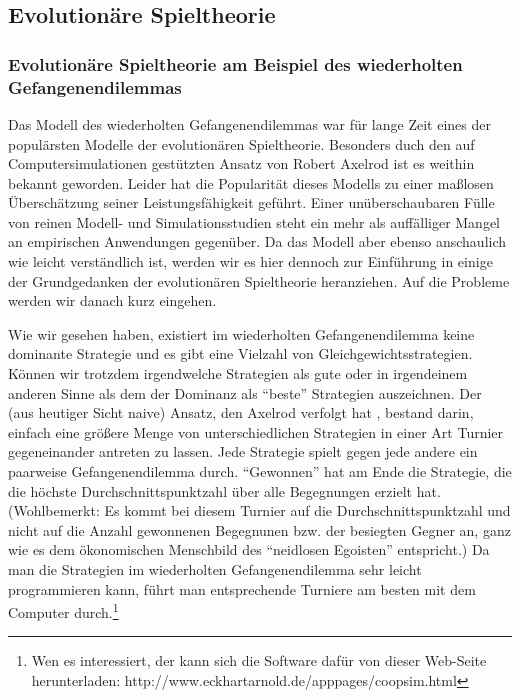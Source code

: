 \subsection{Evolutionäre Spieltheorie}

\subsubsection{Evolutionäre Spieltheorie am Beispiel des wiederholten
Gefangenendilemmas}

Das Modell des wiederholten Gefangenendilemmas war für lange Zeit eines der
populärsten Modelle der evolutionären Spieltheorie. Besonders duch den auf
Computersimulationen gestützten Ansatz von Robert Axelrod \cite[]{axelrod:1984}
ist es weithin bekannt geworden. Leider hat die Popularität dieses Modells zu
einer maßlosen Überschätzung seiner Leistungsfähigkeit geführt. Einer
unüberschaubaren Fülle von reinen Modell- und Simulationsstudien steht ein mehr
als auffälliger Mangel an empirischen Anwendungen gegenüber. Da das Modell aber
ebenso anschaulich wie leicht verständlich ist, werden wir es hier dennoch zur
Einführung in einige der Grundgedanken der evolutionären Spieltheorie
heranziehen. Auf die Probleme werden wir danach kurz eingehen.

Wie wir gesehen haben, existiert im wiederholten Gefangenendilemma keine
dominante Strategie und es gibt eine Vielzahl von Gleichgewichtsstrategien.
Können wir trotzdem irgendwelche Strategien als gute oder in irgendeinem anderen
Sinne als dem der Dominanz als "`beste"' Strategien auszeichnen. Der (aus
heutiger Sicht naive) Ansatz, den Axelrod verfolgt hat \cite[]{axelrod:1984},
bestand darin, einfach eine größere Menge von unterschiedlichen Strategien in
einer Art Turnier gegeneinander antreten zu lassen. Jede Strategie spielt gegen
jede andere ein paarweise Gefangenendilemma durch. "`Gewonnen"' hat am Ende die
Strategie, die die höchste Durchschnittspunktzahl über alle Begegnungen erzielt
hat. (Wohlbemerkt: Es kommt bei diesem Turnier auf die Durchschnittspunktzahl und
nicht auf die Anzahl gewonnenen Begegnunen bzw. der besiegten Gegner an, ganz wie
es dem ökonomischen Menschbild des "`neidlosen Egoisten"' entspricht.) Da man die
Strategien im wiederholten Gefangenendilemma sehr leicht programmieren kann,
führt man entsprechende Turniere am besten mit dem Computer durch.\footnote{Wen
es interessiert, der kann sich die Software dafür von dieser Web-Seite
herunterladen: http://www.eckhartarnold.de/apppages/coopsim.html }

